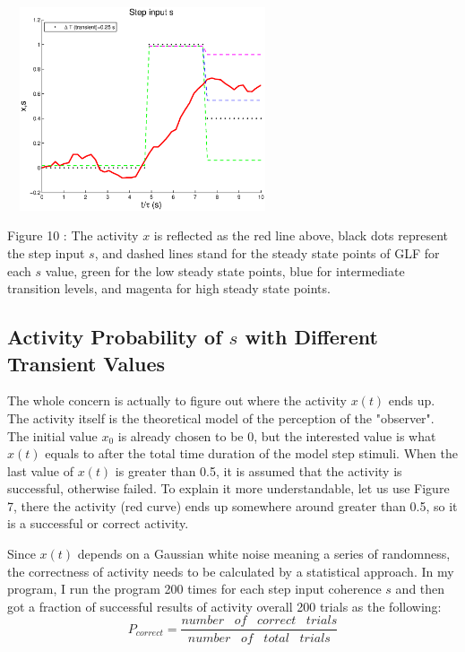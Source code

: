 \documentclass[twocolumn]{article}
\begin{document}
 \begin{center}
\includegraphics[width=80mm,height=60mm]{my_WC.eps} 
   \begin{footnotesize} Figure 10 : The activity $x$ is reflected as the red line above, black dots represent the step input $s$, and dashed lines stand for the steady state points of GLF for each $s$ value, green for the low steady state points, blue for intermediate transition levels, and magenta for high steady state points.  \end{footnotesize}
\end{center}

\subsection{Activity Probability of $s$ with Different Transient Values}
The whole concern is actually to figure out where the activity $x(t)$ ends up. The activity itself is the theoretical model of the perception of the "observer". The initial value $x_0$ is already chosen to be 0, but the interested value is what $x(t)$ equals to after the total time duration of the model step stimuli. When the last value of $x(t)$ is greater than 0.5, it is assumed that the activity is successful, otherwise failed. To explain it more understandable, let us use Figure 7, there the activity (red curve) ends up somewhere around greater than 0.5, so it is a successful or correct activity.

Since $x(t)$ depends on a Gaussian white noise meaning a series of randomness, the correctness of activity needs to be calculated by a  statistical approach. In my program, I run the program 200 times for each step input coherence $s$ and then got a fraction of successful results of activity overall 200 trials as the following:
\begin{equation}
 P_{correct}=\dfrac{number \;\;\;of\;\;\;correct\;\;\;trials}{number\;\;\;of\;\;\;total\;\;\;trials}
\end{equation}
\end{document}

